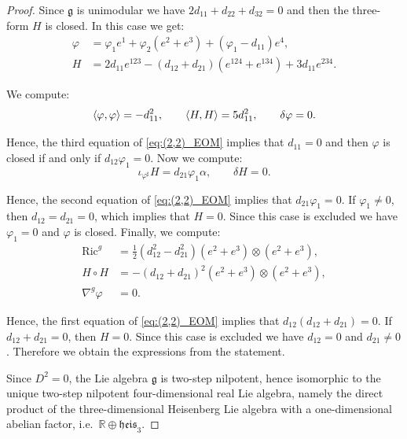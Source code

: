 \documentclass[10pt,reqno]{amsart}
\theoremstyle{definition}
\theoremstyle{remark}
\newcommand{\R}{\mathbb{R}}
\DeclarePairedDelimiter{\escal}{\langle}{\rangle}
\begin{document}
\begin{proof}
    Since $\mathfrak{g}$ is unimodular we have $2d_{11}+d_{22}+d_{32}=0$ and then the three-form $H$ is closed. In this case we get: \begin{align*}
        \varphi&=\varphi_1e^1+\varphi_2(e^2+e^3)+(\varphi_1-d_{11})e^4,\\
        H&=2d_{11}e^{123}-(d_{12}+d_{21})(e^{124}+e^{134})+3d_{11}e^{234}.
    \end{align*}

    We compute: $$\escal{\varphi,\varphi}=-d_{11}^2,\qquad \escal{H,H}=5d_{11}^2,\qquad \delta\varphi=0.$$
    
    Hence, the third equation of \eqref{eq:(2,2)_EOM} implies that $d_{11}=0$ and then $\varphi$ is closed if and only if $d_{12}\varphi_1=0$. Now we compute: $$\iota_{\varphi^\sharp}H=d_{21}\varphi_1\alpha,\qquad \delta H=0.$$
    
    Hence, the second equation of \eqref{eq:(2,2)_EOM} implies that $d_{21}\varphi_1=0$. If $\varphi_1\neq0$, then $d_{12}=d_{21}=0$, which implies that $H=0$. Since this case is excluded we have $\varphi_1=0$ and $\varphi$ is closed. Finally, we compute: \begin{align*}
        \mathrm{Ric}^g&=\tfrac{1}{2}(d_{12}^2-d_{21}^2)(e^2+e^3)\otimes(e^2+e^3),\\
        H\circ H&=-(d_{12}+d_{21})^2(e^2+e^3)\otimes(e^2+e^3),\\
        \nabla^g\varphi&=0.
    \end{align*}

    Hence, the first equation of \eqref{eq:(2,2)_EOM} implies that $d_{12}(d_{12}+d_{21})=0$. If $d_{12}+d_{21}=0$, then $H=0$. Since this case is excluded we have $d_{12}=0$ and $d_{21}\neq0$. Therefore we obtain the expressions from the statement.\medskip
    
    Since $D^2=0$, the Lie algebra $\mathfrak{g}$ is two-step nilpotent, hence isomorphic to the unique two-step nilpotent four-dimensional real Lie algebra, namely the direct product of the three-dimensional Heisenberg Lie algebra with a one-dimensional abelian factor, i.e.\ $\R\oplus\mathfrak{heis}_3$.
\end{proof}
\end{document}
